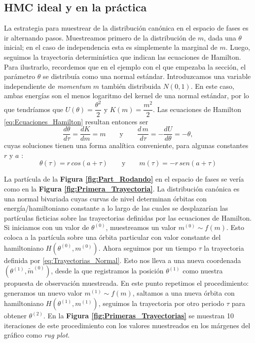 \subsection{HMC ideal y en la práctica} 
 
 La estrategia para muestrear de la distribución canónica en el espacio de fases es ir alternando pasos. Muestreamos primero de la distribución de $m$, dada una $\theta$ inicial; en el caso de independencia esta es simplemente la marginal de $m$. Luego, seguimos la trayectoria determinística que indican las ecuaciones de Hamilton.\\
 
 Para ilustrarlo, recordemos que en el ejemplo con el que empezaba la sección, el parámetro $\theta$ se distribuía como una normal estándar. Introduzcamos una variable independiente de \textit{momentum} $m$ también distribuida $N(0,1)$. En este caso, ambas energías son el menos logaritmo del kernel de una normal estándar, por lo que tendríamos que $U(\theta)=\dfrac{\theta^2}{2}$ y $K(m)=\dfrac{m^2}{2}$. Las ecuaciones de Hamilton \eqref{eq:Ecuaciones_Hamilton} resultan entonces ser
 \begin{equation*}
 \dfrac{d\theta}{d\tau}= \dfrac{dK}{dm} = m \qquad \text{y} \qquad \dfrac{d\,m}{d\tau}= -\dfrac{dU}{d\theta} = -\theta,
 \end{equation*}
 cuyas soluciones tienen una forma analítica conveniente, para algunas constantes $r$ y $a$ \parencite{Neal11}:
 \begin{equation}
 \label{eq:Trayectorias_Normal}
 \theta(\tau) = r\,cos(a + \tau) \qquad \text{y} \qquad m(\tau) = -r\,sen(a + \tau)
 \end{equation}
 
 La partícula de la \textbf{Figura \ref{fig:Part_Rodando}} en el espacio de fases se vería como en la \textbf{Figura \ref{fig:Primera_Trayectoria}}. La distribución canónica es una normal bivariada cuyas curvas de nivel determinan órbitas con energía/hamiltoniano constante a lo largo de las cuales se desplazarían las partículas ficticias sobre las trayectorias definidas por las ecuaciones de Hamilton.\\ 
 
 Si iniciamos con un valor de $\theta^{(0)}$, muestreamos un valor $m^{(0)} \sim f(m)$. Esto coloca a la partícula sobre una órbita particular con valor constante del hamiltoniano $H(\theta^{(0)},m^{(0)})$. Ahora seguimos por un tiempo $\tau$ la trayectoria definida por \eqref{eq:Trayectorias_Normal}. Esto nos lleva a una nueva coordenada $(\theta^{(1)},\tilde{m}^{(0)})$, desde la que registramos la posición $\theta^{(1)}$ como nuestra propuesta de observación muestreada. En este punto repetimos el procedimiento: generamos un nuevo valor $m^{(1)} \sim f(m)$, saltamos a una nueva órbita con hamiltoniano $H(\theta^{(1)},m^{(1)})$, seguimos la trayectoria por otro periodo $\tau$ para obtener $\theta^{(2)}$. En la \textbf{Figura \ref{fig:Primeras_Trayectorias}} se muestran 10 iteraciones de este procedimiento con los valores muestreados en los márgenes del gráfico como \textit{rug plot}.\\ 

